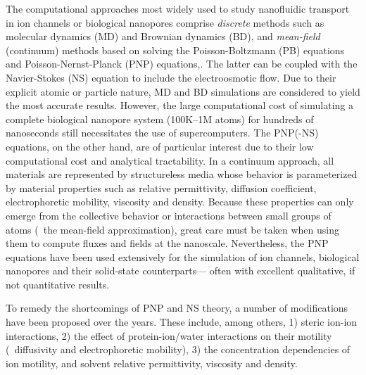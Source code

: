 \documentclass[journal=ancac3,manuscript=article,etalmode=truncate,maxauthors=0,layout=onecolumn]{achemso}
\begin{document}
The computational approaches most widely used to study nanofluidic transport in ion channels or biological
nanopores comprise \emph{discrete} methods such as molecular dynamics
(MD)\cite{Lynden-Bell-1996,Allen-1999,Aksimentiev-2005,Luan-2008,Bhattacharya-2011,Zhang-2014,DiMarino-2015,Belkin-2016}
and Brownian dynamics
(BD),\cite{Schirmer-1999,Im-2002,Noskov-2004,Millar-2008,Egwolf-2010,DeBiase-2015,Pederson-2015} and
\emph{mean-field} (continuum) methods based on solving the Poisson-Boltzmann (PB)
equations\cite{Grochowski-2008, Baldessari-2008-1} and Poisson-Nernst-Planck (PNP)
equations,\cite{Eisenberg-1996,Gillespie-2002, Simakov-2010}. The latter can be coupled with the Navier-Stokes
(NS) equation to include the electroosmotic flow.\cite{Lu-2012,Pederson-2015} Due to their explicit atomic or
particle nature, MD and BD simulations are considered to yield the most accurate results. However, the large
computational cost of simulating a complete biological nanopore system (100K--1M atoms) for hundreds of
nanoseconds still necessitates the use of supercomputers.\cite{Aksimentiev-2005,Bhattacharya-2011} The
PNP(-NS) equations, on the other hand, are of particular interest due to their low computational cost and
analytical tractability. In a continuum approach, all materials are represented by structureless media whose
behavior is parameterized by material properties such as relative permittivity, diffusion coefficient,
electrophoretic mobility, viscosity and density. Because these properties can only emerge from the collective
behavior or interactions between small groups of atoms (\ie{}~the mean-field approximation), great care must
be taken when using them to compute fluxes and fields at the nanoscale.\cite{Corry-2000,Collins-2012}
Nevertheless, the PNP equations have been used extensively for the simulation of ion
channels,\cite{Im-2002,Furini-2006,Liu-2015} biological
nanopores\cite{Simakov-2010,Pederson-2015,Aguilella-Arzo-2017,Simakov-2018} and their solid-state
counterparts\cite{Cervera-2005,White-2008,Chaudhry-2014,Laohakunakorn-2015}--- often with excellent
qualitative, if not quantitative results.\cite{Maffeo-2012,Thomas-2014,Kim-2015}

To remedy the shortcomings of PNP and NS theory, a number of modifications have been proposed over the years.
These include, among others, 1) steric ion-ion interactions, 2) the effect of protein-ion/water interactions
on their motility (\ie{}~diffusivity and electrophoretic mobility), 3) the concentration dependencies of ion
motility, and solvent relative permittivity, viscosity and density.
\end{document}
